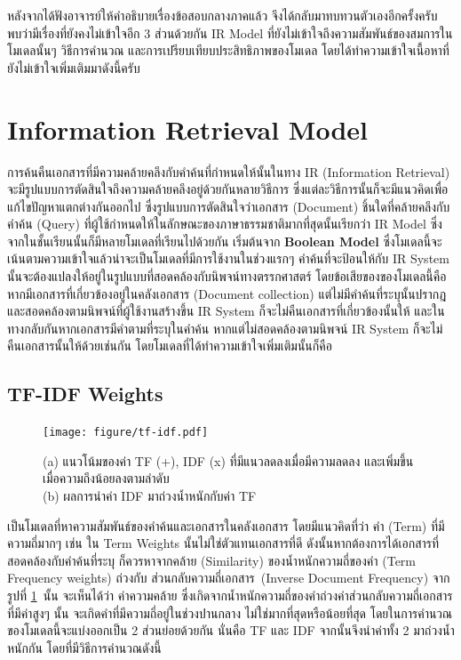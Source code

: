 \documentclass[11pt,a4paper]{article}
\newcommand{\idf}{ส่วนกลับความถี่เอกสาร}
\begin{document}
หลังจากได้ฟังอาจารย์ให้คำอธิบายเรื่องข้อสอบกลางภาคแล้ว จึงได้กลับมาทบทวนตัวเองอีกครั้งครับ พบว่ามีเรื่องที่ยังคงไม่เข้าใจอีก 3 ส่วนด้วยกัน IR Model 
ที่ยังไม่เข้าใจถึงความสัมพันธ์ของสมการในโมเดลนั้นๆ 
วิธีการคำนวณ และการเปรียบเทียบประสิทธิภาพของโมเดล โดยได้ทำความเข้าใจเนื้อหาที่ยังไม่เข้าใจเพิ่มเติมมาดังนี้ครับ

\section{Information Retrieval Model}

การค้นคืนเอกสารที่มีความคล้ายคลึงกับคำค้นที่กำหนดให้นั้นในทาง IR (Information Retrieval) จะมีรูปแบบการตัดสินใจถึงความคล้ายคลึงอยู่ด้วยกันหลายวิธีการ 
ซึ่งแต่ละวิธีการนั้นก็จะมีแนวคิดเพื่อแก้ไขปัญหาแตกต่างกันออกไป ซึ่งรูปแบบการตัดสินใจว่าเอกสาร (Document) ชิ้นใดที่คล้ายคลึงกับคำค้น (Query) 
ที่ผู้ใช้กำหนดให้ในลักษณะของภาษาธรรมชาติมากที่สุดนั้นเรียกว่า IR Model ซึ่งจากในชั้นเรียนนั้นก็มีหลายโมเดลที่เรียนไปด้วยกัน เริ่มต้นจาก {\bf Boolean Model} 
ซึ่งโมเดลนี้จะเน้นตามความเข้าใจแล้วน่าจะเป็นโมเดลที่มีการใช้งานในช่วงแรกๆ คำค้นที่จะป้อนให้กับ IR System นั้นจะต้องแปลงให้อยู่ในรูปแบบที่สอดคล้องกับนิพจน์ทางตรรกศาสตร์ 
โดยข้อเสียของของโมเดลนี้คือหากมีเอกสารที่เกี่ยวข้องอยู่ในคลังเอกสาร (Document collection) แต่ไม่มีคำค้นที่ระบุนั้นปรากฎและสอดคล้องตามนิพจน์ที่ผู้ใช้งานสร้างขึ้น IR System 
ก็จะไม่คืนเอกสารที่เกี่ยวข้องนั้นให้ และในทางกลับกันหากเอกสารมีคำตามที่ระบุในคำค้น หากแต่ไม่สอดคล้องตามนิพจน์ IR System ก็จะไม่คืนเอกสารนั้นให้ด้วยเช่นกัน 
โดยโมเดลที่ได้ทำความเข้าใจเพิ่มเติมนั้นก็คือ

\subsection{TF-IDF Weights}

\begin{figure}[ht!]
    \centering
    \texttt{[image: figure/tf-idf.pdf]}
    \caption{ (a) แนวโน้มของค่า TF (+), IDF (x) ที่มีแนวลดลงเมื่อมีความลดลง และเพิ่มขึ้นเมื่อความถึงน้อยลงตามลำดับ \\ (b) ผลการนำค่า IDF มาถ่วงน้ำหนักกับค่า TF}
    \label{fig:tfandidf}
\end{figure}

เป็นโมเดลที่หาความสัมพันธ์ของคำค้นและเอกสารในคลังเอกสาร โดยมีแนวคิดที่ว่า คำ (Term) ที่มีความถี่มากๆ เช่น ใน Term Weights นั้นไม่ใช่ตัวแทนเอกสารที่ดี 
ดังนั้นหากต้องการได้เอกสารที่สอดคล้องกับคำค้นที่ระบุ ก็ควรหาจากคล้าย (Similarity) ของน้ำหนักความถี่ของคำ (Term Frequency weights) ถ่วงกับ 
{\idf}\ (Inverse Document Frequency) จากรูปที่ {\ref{fig:tfandidf}}\ นั้น จะเห็นได้ว่า ค่าความคล้าย 
ซึ่งเกิดจากน้ำหนักความถี่ของคำถ่วงค่า{\idf}ที่มีค่าสูงๆ นั้น จะเกิดคำที่มีความถี่อยู่ในช่วงปานกลาง ไม่ใช่มากที่สุดหรือน้อยที่สุด 
โดยในการคำนวณของโมเดลนี้จะแบ่งออกเป็น 2 ส่วนย่อยด้วยกัน นั่นคือ TF และ IDF จากนั้นจึงนำค่าทั้ง 2 มาถ่วงน้ำหนักกัน โดยที่มีวิธีการคำนวณดังนี้
\end{document}
